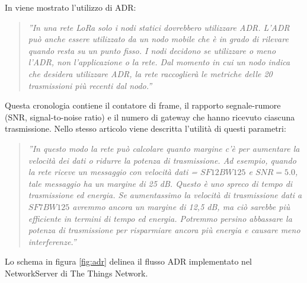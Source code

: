 \documentclass[a4paper]{report} %
\begin{document}
In \cite{art:rif.32} viene mostrato l'utilizzo di ADR:
\begin{quote}
	\textit{''In una rete LoRa solo i nodi statici dovrebbero utilizzare ADR. L'ADR può anche essere utilizzato da un nodo mobile che è in grado di rilevare quando resta su un punto fisso. I nodi decidono se utilizzare o meno l'ADR, non l'applicazione o la rete. Dal momento in cui un nodo indica che desidera utilizzare ADR, la rete raccoglierà le metriche delle 20 trasmissioni più recenti dal nodo.''}
\end{quote}
Questa cronologia contiene il contatore di frame, il rapporto segnale-rumore (SNR, signal-to-noise ratio) e il numero di gateway che hanno ricevuto ciascuna trasmissione. Nello stesso articolo viene descritta l'utilità di questi parametri:
\begin{quote}
	\textit{''In questo modo la rete può calcolare quanto margine c'è per aumentare la velocità dei dati o ridurre la potenza di trasmissione. Ad esempio, quando la rete riceve un messaggio con velocità dati = $SF12BW125$ e $SNR = 5.0$, tale messaggio ha un margine di 25 dB. Questo è uno spreco di tempo di trasmissione ed energia. Se aumentassimo la velocità di trasmissione dati a $SF7BW125$ avremmo ancora un margine di 12,5 dB, ma ciò sarebbe più efficiente in termini di tempo ed energia. Potremmo persino abbassare la potenza di trasmissione per risparmiare ancora più energia e causare meno interferenze.''} 
\end{quote}	
Lo schema in figura \ref{fig:adr} delinea il flusso ADR implementato nel NetworkServer di The Things Network.
\end{document}
